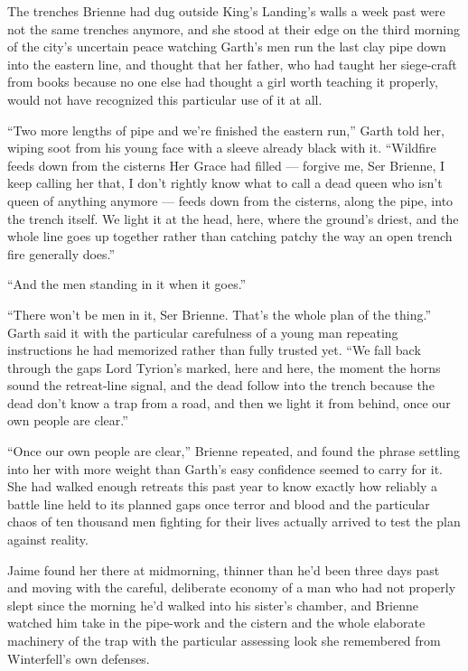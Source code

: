 The trenches Brienne had dug outside King’s Landing’s walls a week past were not the same trenches anymore, and she stood at their edge on the third morning of the city’s uncertain peace watching Garth’s men run the last clay pipe down into the eastern line, and thought that her father, who had taught her siege-craft from books because no one else had thought a girl worth teaching it properly, would not have recognized this particular use of it at all.

“Two more lengths of pipe and we’re finished the eastern run,” Garth told her, wiping soot from his young face with a sleeve already black with it. “Wildfire feeds down from the cisterns Her Grace had filled — forgive me, Ser Brienne, I keep calling her that, I don’t rightly know what to call a dead queen who isn’t queen of anything anymore — feeds down from the cisterns, along the pipe, into the trench itself. We light it at the head, here, where the ground’s driest, and the whole line goes up together rather than catching patchy the way an open trench fire generally does.”

“And the men standing in it when it goes.”

“There won’t be men in it, Ser Brienne. That’s the whole plan of the thing.” Garth said it with the particular carefulness of a young man repeating instructions he had memorized rather than fully trusted yet. “We fall back through the gaps Lord Tyrion’s marked, here and here, the moment the horns sound the retreat-line signal, and the dead follow into the trench because the dead don’t know a trap from a road, and then we light it from behind, once our own people are clear.”

“Once our own people are clear,” Brienne repeated, and found the phrase settling into her with more weight than Garth’s easy confidence seemed to carry for it. She had walked enough retreats this past year to know exactly how reliably a battle line held to its planned gaps once terror and blood and the particular chaos of ten thousand men fighting for their lives actually arrived to test the plan against reality.

\sceneBreak

Jaime found her there at midmorning, thinner than he’d been three days past and moving with the careful, deliberate economy of a man who had not properly slept since the morning he’d walked into his sister’s chamber, and Brienne watched him take in the pipe-work and the cistern and the whole elaborate machinery of the trap with the particular assessing look she remembered from Winterfell’s own defenses.

